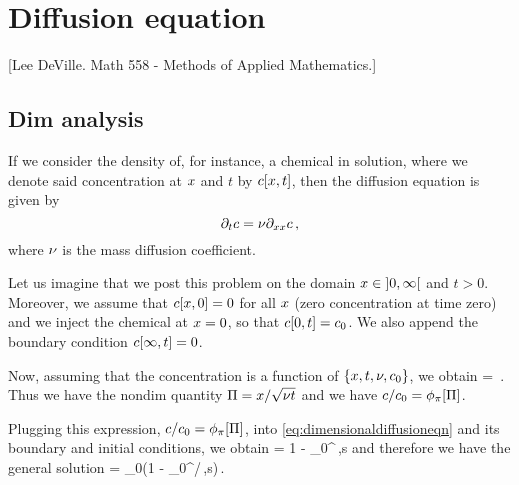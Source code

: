 \section{Diffusion equation}
%
\newcommand{\krcoeff}{\gamma} %


[Lee DeVille. Math 558 - Methods of Applied Mathematics.]


\subsection{Dim analysis}
If we consider the density of, for instance, a chemical in solution, where we denote said concentration at $x$ and $t$ by $c\!\left[{x, t}\right]$, then the diffusion equation is given by
\begin{equation}\label{eq:dimensionaldiffusioneqn}
\partial_{t}c = \nu\partial_{xx}c\,,
\end{equation}
where $\nu$ is the mass diffusion coefficient.

Let us imagine that we post this problem on the domain $x\in \left]{0, \infty}\right[$ and $t > 0$. Moreover, we assume that $c\!\left[{x, 0}\right] = 0$ for all $x$ (zero concentration at time zero) and we inject the chemical at $x = 0$, so that $c\!\left[{0, t}\right] = c_0$. We also append the boundary condition $c\!\left[{\infty, t}\right] = 0$.

Now, assuming that the concentration is a function of $\left\lbrace{x, t, \nu, c_0}\right\rbrace$, we obtain
\beq
{} = \kdimf{}\,.
\eeq
Thus we have the nondim quantity $\Pi = x/\sqrt{\nu t}$ and we have $c/c_0 = \phi_{\pi}\!\left[{\Pi}\right]$.

Plugging this expression, $c/c_0 = \phi_{\pi}\!\left[{\Pi}\right]$, into \autoref{eq:dimensionaldiffusioneqn} and its boundary and initial conditions, we obtain
\beq
\kdimf\vat{\kdim} = 1 - \int_0^\kdim \exp{}\,,\dx s
\eeq
and therefore we have the general solution
\beq
\conc{} = \conc_0\left(1 - \int_0^{\lpos/}\exp{}\,,\dx s\right)\,.
\eeq


